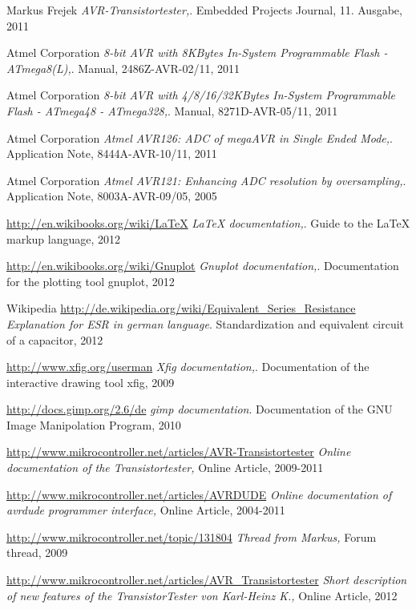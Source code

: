\documentclass[12pt,a4paper,oneside,english]{report}
\begin{document}
\begin{thebibliography}{99}

Markus Frejek
\emph{AVR-Transistortester,}.
Embedded Projects Journal,
11. Ausgabe,
2011

Atmel Corporation
\emph{8-bit AVR with 8KBytes In-System Programmable Flash - ATmega8(L),}.
Manual,
2486Z-AVR-02/11,
2011

Atmel Corporation
\emph{8-bit AVR with 4/8/16/32KBytes In-System Programmable Flash - ATmega48 - ATmega328,}.
Manual,
8271D-AVR-05/11,
2011

Atmel Corporation
\emph{Atmel AVR126: ADC of megaAVR in Single Ended Mode,}.
Application Note,
8444A-AVR-10/11,
2011

Atmel Corporation
\emph{Atmel AVR121: Enhancing ADC resolution by oversampling,}.
Application Note,
8003A-AVR-09/05,
2005

\url{http://en.wikibooks.org/wiki/LaTeX}
\emph{LaTeX documentation,}.
Guide to the LaTeX markup language,
2012

\url{http://en.wikibooks.org/wiki/Gnuplot}
\emph{Gnuplot documentation,}.
Documentation for the plotting tool gnuplot,
2012

Wikipedia
\url{http://de.wikipedia.org/wiki/Equivalent\_Series\_Resistance}
\emph{Explanation for ESR in german language}.
Standardization and equivalent circuit of a capacitor,
2012


\url{http://www.xfig.org/userman}
\emph{Xfig documentation,}.
Documentation of the interactive drawing tool xfig,
2009

\url{http://docs.gimp.org/2.6/de}
\emph{gimp documentation}.
Documentation of the GNU Image Manipolation Program,
2010

\url{http://www.mikrocontroller.net/articles/AVR-Transistortester}
\emph{Online documentation of the Transistortester,}
Online Article,
2009-2011

\url{http://www.mikrocontroller.net/articles/AVRDUDE}
\emph{Online documentation of avrdude programmer interface,}
Online Article,
2004-2011

\url{http://www.mikrocontroller.net/topic/131804}
\emph{Thread from Markus,}
Forum thread, 
2009

\url{http://www.mikrocontroller.net/articles/AVR\_Transistortester}
\emph{Short description of new features of the TransistorTester von Karl-Heinz K.,}
Online Article,
2012


\end{thebibliography}
\end{document}
